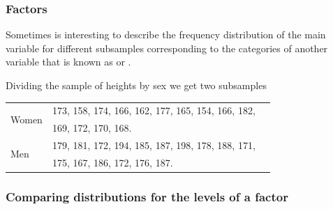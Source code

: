 \begin{frame}
\frametitle{Factors}
Sometimes is interesting to describe the frequency distribution of the main variable for different subsamples
corresponding to the categories of another variable that is known as  or
.

 Dividing the sample of heights by sex we get two subsamples
\begin{center}
\begin{tabular}{lll}
\hline
\multirow{2}{*}{Women} &
173, 158, 174, 166, 162, 177, 165, 154, 166, 182, \\
& 169, 172, 170, 168. \\
\hline
\multirow{2}{*}{Men} &
179, 181, 172, 194, 185, 187, 198, 178, 188, 171,\\
& 175, 167, 186, 172, 176, 187. \\
\hline
\end{tabular}
\end{center}
\end{frame}


\begin{frame}
\frametitle{Comparing distributions for the levels of a factor }

\begin{center} 
\scalebox{0.45}{}
\scalebox{0.45}{}
\end{center}
\end{frame}
